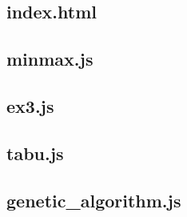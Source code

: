 \documentclass[a4paper,12pt]{article}
\begin{document}
\subsection{index.html}



\subsection{minmax.js}



\subsection{ex3.js}



\subsection{ tabu.js }



\subsection{ genetic\_algorithm.js }


\end{document}

